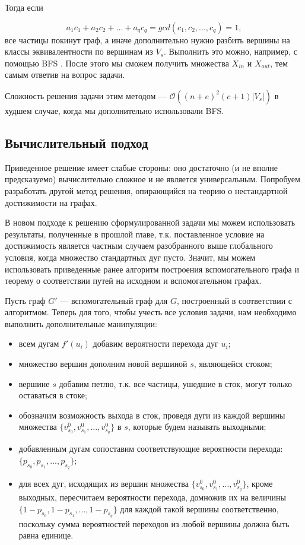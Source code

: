 Тогда если 

\begin{equation*}
a_1c_1 + a_2c_2 + ... + a_qc_q = gcd(c_1, c_2, ... , c_q) = 1,
\end{equation*}	все частицы покинут граф, а иначе дополнительно нужно разбить вершины на классы эквивалентности по вершинам из $V_s$. Выполнить это можно, например, с помощью BFS \cite{BFS}. После этого мы сможем получить множества $X_{in}$ и $X_{out}$, тем самым ответив на вопрос задачи. 

Сложность решения задачи этим методом --- $\mathcal{O}((n + e)^2(c + 1)|V_s|)$ в худшем случае, когда мы дополнительно использовали BFS.

\subsection{Вычислительный подход}

Приведенное решение имеет слабые стороны: оно достаточно (и не вполне предсказуемо) вычислительно сложное и не является универсальным. Попробуем разработать другой метод решения, опирающийся на теорию о нестандартной достижимости на графах. 

В новом подходе к решению сформулированной задачи мы можем использовать результаты, полученные в прошлой главе, т.к. поставленное условие на достижимость является частным случаем разобранного выше глобального условия, когда множество стандартных дуг пусто. Значит, мы можем использовать приведенные ранее алгоритм построения вспомогательного графа и теорему о соответствии путей на исходном и вспомогательном графах.  

Пусть граф $G'$ --- вспомогательный граф для $G$, построенный в соответствии с алгоритмом. Теперь для того, чтобы учесть все условия задачи, нам необходимо выполнить дополнительные манипуляции:

\begin{itemize}
	\item всем дугам $f'(u_i)$ добавим вероятности перехода дуг $u_i$;
	\item множество вершин дополним новой вершиной $s$, являющейся стоком;
	\item вершине $s$ добавим петлю, т.к. все частицы, ушедшие в сток, могут только оставаться в стоке;
	\item обозначим возможность выхода в сток, проведя дуги из каждой вершины множества $\{v^0_{s_0}, v^0_{s_1}, ... , v^0_{s_q}\}$ в $s$, которые будем называть выходными;
	\item добавленным дугам сопоставим соответствующие вероятности перехода: $\{p_{s_0}, p_{s_1}, ... , p_{s_q}\}$;
	\item для всех дуг, исходящих из вершин множества $\{v^0_{s_0}, v^0_{s_1}, ... , v^0_{s_q}\}$, кроме выходных, пересчитаем вероятности перехода, 
	домножив их на величины $\{ 1 - p_{s_0}, 1 - p_{s_1}, ... , 1 - p_{s_q}\}$ для каждой такой вершины соответственно, поскольку сумма вероятностей переходов из любой вершины должна быть равна единице.
\end{itemize}	


